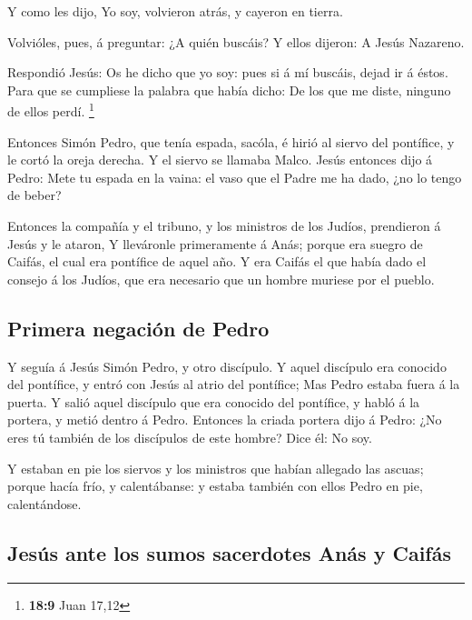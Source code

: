  Y como les dijo, Yo soy, volvieron atrás, y cayeron en
tierra.

 Volvióles, pues, á preguntar: ¿A quién buscáis? Y ellos
dijeron: A Jesús Nazareno.

 Respondió Jesús: Os he dicho que yo soy: pues si á mí
buscáis, dejad ir á éstos.  Para que se cumpliese la
palabra que había dicho: De los que me diste, ninguno de ellos perdí.
\footnote{\textbf{18:9} Juan 17,12}

 Entonces Simón Pedro, que tenía espada, sacóla, é hirió
al siervo del pontífice, y le cortó la oreja derecha. Y el siervo se
llamaba Malco.  Jesús entonces dijo á Pedro: Mete tu
espada en la vaina: el vaso que el Padre me ha dado, ¿no lo tengo de
beber?

 Entonces la compañía y el tribuno, y los ministros de
los Judíos, prendieron á Jesús y le ataron,  Y lleváronle
primeramente á Anás; porque era suegro de Caifás, el cual era pontífice
de aquel año.  Y era Caifás el que había dado el consejo
á los Judíos, que era necesario que un hombre muriese por el pueblo.

\hypertarget{primera-negaciuxf3n-de-pedro}{%
\subsection{Primera negación de
Pedro}\label{primera-negaciuxf3n-de-pedro}}

 Y seguía á Jesús Simón Pedro, y otro discípulo. Y aquel
discípulo era conocido del pontífice, y entró con Jesús al atrio del
pontífice;  Mas Pedro estaba fuera á la puerta. Y salió
aquel discípulo que era conocido del pontífice, y habló á la portera, y
metió dentro á Pedro.  Entonces la criada portera dijo á
Pedro: ¿No eres tú también de los discípulos de este hombre? Dice él: No
soy.

 Y estaban en pie los siervos y los ministros que habían
allegado las ascuas; porque hacía frío, y calentábanse: y estaba también
con ellos Pedro en pie, calentándose.

\hypertarget{jesuxfas-ante-los-sumos-sacerdotes-anuxe1s-y-caifuxe1s}{%
\subsection{Jesús ante los sumos sacerdotes Anás y
Caifás}\label{jesuxfas-ante-los-sumos-sacerdotes-anuxe1s-y-caifuxe1s}}

